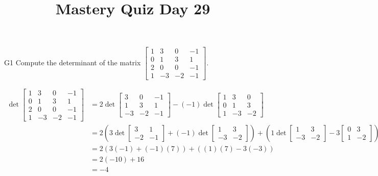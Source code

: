 \documentclass{sbgLAquiz}
\title{Mastery Quiz Day 29 }
\begin{document}
\begin{problem}{G1}
Compute the determinant of the matrix $\begin{bmatrix} 1 & 3 & 0 & -1 \\ 0 & 1 & 3 & 1 \\ 2 & 0 & 0 & -1 \\ 1 & -3 & -2 & -1 \end{bmatrix}$.
\end{problem}
\begin{solution}
\begin{align*}
\det \begin{bmatrix} 1 & 3 & 0 & -1 \\ 0 & 1 & 3 & 1 \\ 2 & 0 & 0 & -1 \\ 1 & -3 & -2 & -1 \end{bmatrix} &= 2 \det \begin{bmatrix} 3 & 0 & -1 \\ 1 & 3 & 1 \\ -3 & -2 & -1 \end{bmatrix} -(-1) \det \begin{bmatrix} 1 & 3 & 0 \\ 0 & 1 & 3 \\ 1 & -3 & -2 \end{bmatrix} \\
&=2\left( 3 \det \begin{bmatrix} 3 & 1 \\ -2 & -1 \end{bmatrix} + (-1) \det \begin{bmatrix} 1 & 3 \\ -3 & -2 \end{bmatrix}\right) + \left( 1 \det \begin{bmatrix} 1 & 3 \\ -3 & -2 \end{bmatrix} -3 \begin{bmatrix} 0 & 3 \\ 1 & -2 \end{bmatrix} \right) \\
&=2 \left( 3(-1)+(-1)(7) \right) + \left( (1)(7)-3(-3) \right) \\
&= 2(-10)+16 \\
&=-4
\end{align*}
\end{solution}
\end{document}
